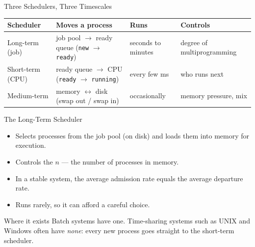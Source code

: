 \documentclass[aspectratio=169]{beamer}
\begin{document}
\begin{frame}{Three Schedulers, Three Timescales}
  \centering
  \small
  \renewcommand{\arraystretch}{1.3}
  \begin{tabular}{@{}p{}p{}p{}p{}@{}}
    \textbf{Scheduler} & \textbf{Moves a process} & \textbf{Runs} & \textbf{Controls} \\
    \hline
    Long-term (job) & job pool $\to$ ready queue (\texttt{new} $\to$ \texttt{ready}) &
      seconds to minutes & degree of multiprogramming \\
    Short-term (CPU) & ready queue $\to$ CPU (\texttt{ready} $\to$ \texttt{running}) &
      every few ms & who runs next \\
    Medium-term & memory $\leftrightarrow$ disk (swap out / swap in) &
      occasionally & memory pressure, mix \\
  \end{tabular}
  \vspace{0.3cm}
\end{frame}

\begin{frame}{The Long-Term Scheduler}
  \begin{itemize}
    \item Selects processes from the job pool (on disk) and loads them into
      memory for execution.
    \item Controls the  $n$ --- the number of
      processes in memory.
    \item In a stable system, the average admission rate equals the average
      departure rate.
    \item Runs rarely, so it can afford a careful choice.
  \end{itemize}
  \vspace{0.2cm}
  \begin{alertblock}{Where it exists}
    Batch systems have one. Time-sharing systems such as UNIX and Windows
    often have \emph{none}: every new process goes straight to the
    short-term scheduler.
  \end{alertblock}
\end{frame}
\end{document}
